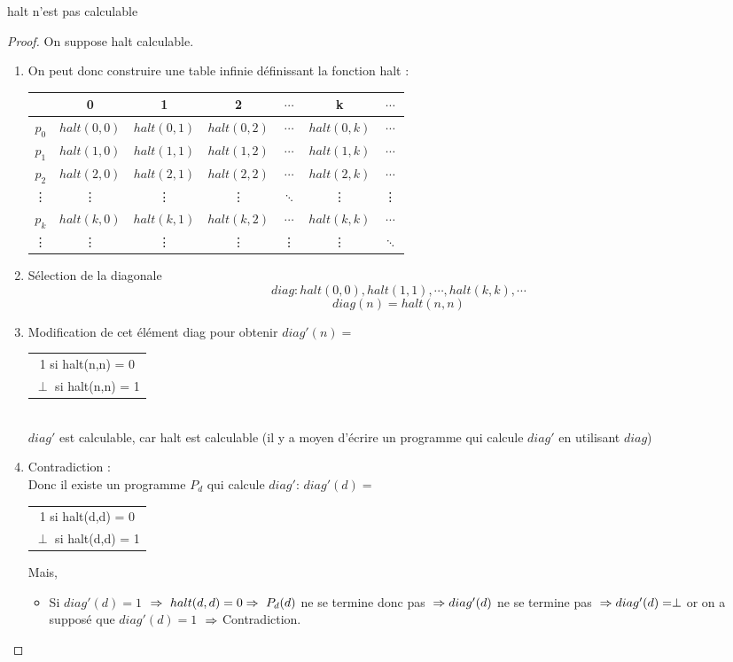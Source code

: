 \begin{mytheo}[halt]
	halt n'est pas calculable
	\begin{proof}
	On suppose halt calculable.
	\begin{enumerate}
		\item On peut donc construire une table infinie définissant la fonction
			halt : \\
			\begin{tabular}{|c||c|c|c|c|c|c|}
				\hline
				& 0 & 1 & 2 & $\cdots$ & k & $\cdots$ \\
				\hline
				$p_0$ & $halt(0,0)$ & $halt(0,1)$ & $halt(0,2)$ & $\cdots$ & $halt(0,k)$ & $\cdots$ \\
				$p_1$ & $halt(1,0)$ & $halt(1,1)$ & $halt(1,2)$ & $\cdots$ & $halt(1,k)$ & $\cdots$ \\
				$p_2$ & $halt(2,0)$ & $halt(2,1)$ & $halt(2,2)$ & $\cdots$ & $halt(2,k)$ & $\cdots$ \\
				\vdots & {\vdots} &{\vdots}& {\vdots} & $\ddots$ & {\vdots} &{\vdots}\\
				$p_k$ & $halt(k,0)$ & $halt(k,1)$ & $halt(k,2)$ & $\cdots$ & $halt(k,k)$ & $\cdots$ \\
				\vdots & {\vdots} &{\vdots}& {\vdots} & {\vdots} & {\vdots} &$\ddots$\\
				\hline
			\end{tabular}
		\item Sélection de la diagonale
			\[ diag :halt(0,0),halt(1,1),\cdots ,halt(k,k), \cdots \]
			\[diag(n) = halt(n,n)\]
		\item Modification de cet élément diag pour obtenir
			$diag'(n) =$
			\begin{tabular}{c}
				1 si halt(n,n) = 0\\
				$\perp$ si halt(n,n) = 1\\
			\end{tabular}\\
			$diag'$ est calculable, car halt est calculable (il y a moyen
			d'écrire un programme qui calcule $diag'$ en utilisant $diag$)
		\item Contradiction :\\
		       	Donc il existe un programme $P_d$ qui calcule
			$diag'$:
			$diag'(d) =$
			\begin{tabular}{c}
				1 si halt(d,d) = 0\\
				$\perp$ si halt(d,d) = 1\\
			\end{tabular}
			Mais,
			\begin{itemize}
				\item Si $diag'(d)= 1$ $\\
				\Rightarrow \  halt(d,d) = 0 \\
				\Rightarrow \ P_d(d)$ ne se termine donc pas $ \\
				\Rightarrow diag'(d)$ ne se termine pas $ \\
				\Rightarrow diag'(d) = \perp$ or on a supposé que $diag'(d) = 1$ $ \\
				\Rightarrow $
				Contradiction.
	

\end{itemize}
\end{enumerate}
\end{proof}
\end{mytheo}
